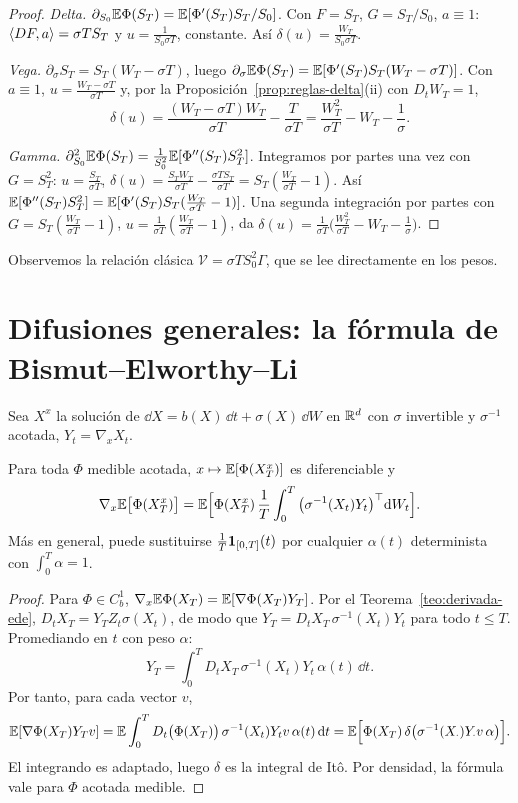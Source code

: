 \begin{proof}
\emph{Delta.} $\partial_{S_0}\mathbb{E}\Phi(S_T)=\mathbb{E}[\Phi'(S_T)S_T/S_0]$. Con $F=S_T$, $G=S_T/S_0$, $a\equiv1$:
$\left\langle DF, a\right\rangle=\sigma TS_T$ y $u=\frac1{S_0\sigma T}$, constante. Así $\delta(u)=\frac{W_T}{S_0\sigma T}$.

\emph{Vega.} $\partial_\sigma S_T=S_T(W_T-\sigma T)$, luego $\partial_\sigma\mathbb{E}\Phi(S_T)=\mathbb{E}[\Phi'(S_T)S_T(W_T-\sigma T)]$. Con $a\equiv1$,
$u=\frac{W_T-\sigma T}{\sigma T}$ y, por la Proposición~\ref{prop:reglas-delta}(ii) con $D_tW_T=1$,
\[
  \delta(u)=\frac{(W_T-\sigma T)W_T}{\sigma T}-\frac{T}{\sigma T}=\frac{W_T^2}{\sigma T}-W_T-\frac1\sigma.
\]

\emph{Gamma.} $\partial^2_{S_0}\mathbb{E}\Phi(S_T)=\frac1{S_0^2}\mathbb{E}[\Phi''(S_T)S_T^2]$. Integramos por partes una vez con $G=S_T^2$: $u=\frac{S_T}{\sigma T}$,
$\delta(u)=\frac{S_TW_T}{\sigma T}-\frac{\sigma TS_T}{\sigma T}=S_T(\frac{W_T}{\sigma T}-1)$. Así $\mathbb{E}[\Phi''(S_T)S_T^2]=\mathbb{E}[\Phi'(S_T)S_T(\frac{W_T}{\sigma T}-1)]$. Una segunda
integración por partes con $G=S_T(\frac{W_T}{\sigma T}-1)$, $u=\frac1{\sigma T}(\frac{W_T}{\sigma T}-1)$, da $\delta(u)=\frac1{\sigma T}\big(\frac{W_T^2}{\sigma T}-W_T-\frac1\sigma\big)$.
\end{proof}

Observemos la relación clásica $\mathcal V=\sigma TS_0^2\Gamma$, que se lee directamente en los pesos.

\section{Difusiones generales: la fórmula de Bismut--Elworthy--Li}
Sea $X^x$ la solución de $\dd X=b(X)\,\dd t+\sigma(X)\,\dd W$ en $\mathbb{R}^d$ con $\sigma$ invertible y $\sigma^{-1}$ acotada,
$Y_t=\nabla_xX_t$.

\begin{teorema}\label{teo:bel}
Para toda $\Phi$ medible acotada, $x\mapsto\mathbb{E}[\Phi(X_T^x)]$ es
diferenciable y
\[
  \nabla_x\mathbb{E}\big[\Phi(X_T^x)\big]=\mathbb{E}\Big[\Phi(X_T^x)\,\frac1T\int_0^T\big(\sigma^{-1}(X_t)Y_t\big)^\top\mathrm{d} W_t\Big].
\]
Más en general, puede sustituirse $\frac1T\mathbf{1}_{[0,T]}(t)$ por cualquier $\alpha(t)$ determinista con $\int_0^T\alpha=1$.
\end{teorema}

\begin{proof}
Para $\Phi\in C_b^1$, $\nabla_x\mathbb{E}\Phi(X_T)=\mathbb{E}[\nabla\Phi(X_T)Y_T]$. Por el Teorema~\ref{teo:derivada-ede}, $D_tX_T=
Y_TZ_t\sigma(X_t)$, de modo que $Y_T=D_tX_T\,\sigma^{-1}(X_t)Y_t$ para todo $t\le T$. Promediando en $t$ con peso
$\alpha$:
\[
  Y_T=\int_0^TD_tX_T\,\sigma^{-1}(X_t)Y_t\,\alpha(t)\,\dd t.
\]
Por tanto, para cada vector $v$,
\[
  \mathbb{E}[\nabla\Phi(X_T)Y_Tv]=\mathbb{E}\int_0^TD_t\big(\Phi(X_T)\big)\,\sigma^{-1}(X_t)Y_tv\,\alpha(t)\,\mathrm{d} t=\mathbb{E}\Big[\Phi(X_T)\,\delta\big(\sigma^{-1}(X_\cdot)Y_\cdot v\,\alpha\big)\Big].
\]
El integrando es adaptado, luego $\delta$ es la integral de Itô. Por densidad, la fórmula vale para $\Phi$
acotada medible.
\end{proof}

